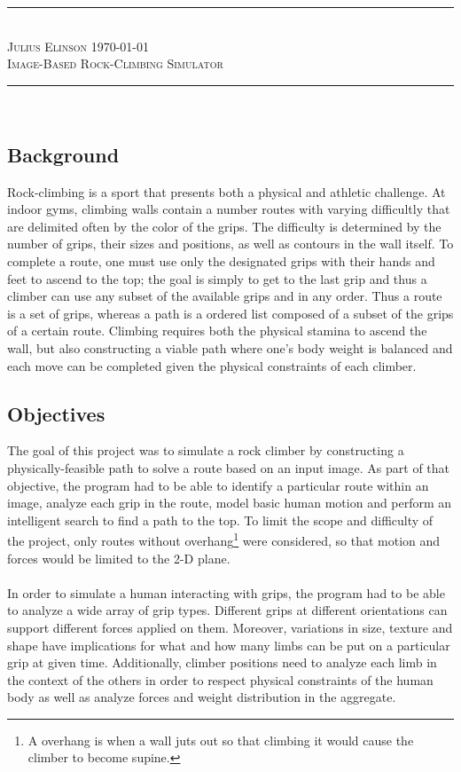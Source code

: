 \documentclass[pdftex,12pt]{article}
\newcommand{\horbar}{\rule{\linewidth}{0.4mm}}
\theoremstyle{definition}
\theoremstyle{remark}
\begin{document}
\begin{center}
\horbar \\
\textsc{Julius Elinson} \hfill \textsc{\today}\\[.1cm]
\textsc{\Large{Image-Based Rock-Climbing Simulator}}\\[-.1cm]
\horbar \\[.4cm]
\end{center}

\subsection*{Background}
Rock-climbing is a sport that presents both a physical and athletic challenge. At indoor gyms, climbing walls contain a number routes with varying difficultly that are delimited often by the color of the grips. The difficulty is determined by the number of grips, their sizes and positions, as well as contours in the wall itself. To complete a route, one must use only the designated grips with their hands and feet to ascend to the top; the goal is simply to get to the last grip and thus a climber can use any subset of the available grips and in any order. Thus a route is a set of grips, whereas a path is a ordered list composed of a subset of the grips of a certain route. Climbing requires both the physical stamina to ascend the wall, but also constructing a viable path where one's body weight is balanced and each move can be completed given the physical constraints of each climber.

\subsection*{Objectives}
The goal of this project was to simulate a rock climber by constructing a physically-feasible path to solve a route based on an input image. As part of that objective, the program had to be able to identify a particular route within an image, analyze each grip in the route, model basic human motion and perform an intelligent search to find a path to the top. To limit the scope and difficulty of the project, only routes without overhang\footnote{A overhang is when a wall juts out so that climbing it would cause the climber to become supine.} were considered, so that motion and forces would be limited to the 2-D plane. \\ \\
In order to simulate a human interacting with grips, the program had to be able to analyze a wide array of grip types. Different grips at different orientations can support different forces applied on them. Moreover, variations in size, texture and shape have implications for what and how many limbs can be put on a particular grip at given time. Additionally, climber positions need to analyze each limb in the context of the others in order to respect physical constraints of the human body as well as analyze forces and weight distribution in the aggregate.
\end{document}
